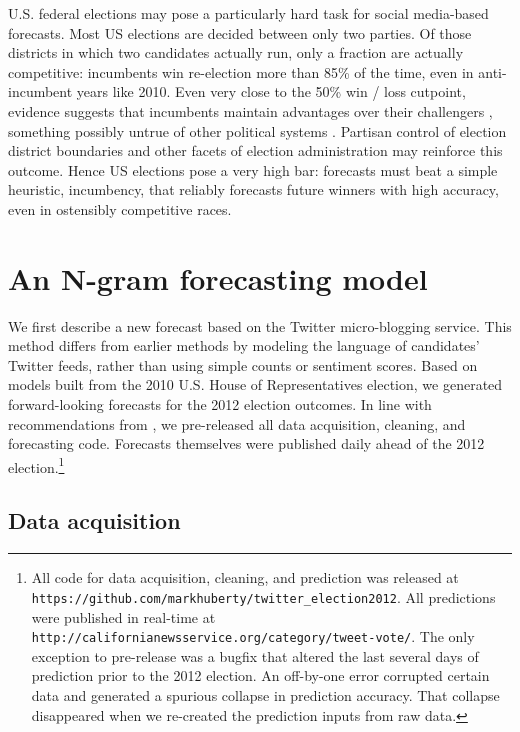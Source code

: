 \documentclass{sig-alternate-2013}
\begin{document}
U.S. federal elections may pose a particularly hard task for social
media-based forecasts. Most US elections are decided between only two
parties. Of those districts in which two candidates actually run, only
a fraction are actually competitive: incumbents win re-election more
than 85\% of the time, even in anti-incumbent years like 2010. Even
very close to the 50\% win / loss cutpoint, evidence suggests that
incumbents maintain advantages over their challengers
\cite{caughey2011elections}, something possibly untrue of other
political systems \cite{eggers2013validity}. Partisan control of
election district boundaries and other facets of election
administration may reinforce this outcome. Hence US elections pose a
very high bar: forecasts must beat a simple heuristic, incumbency,
that reliably forecasts future winners with high accuracy, even in
ostensibly competitive races.

\section{An N-gram forecasting model}
\label{sec:multi-cycle-forecast}

We first describe a new forecast based on the Twitter micro-blogging
service. This method differs from earlier methods by 
modeling the language of candidates' Twitter feeds, rather than using
simple counts or sentiment scores. Based on models built from the 2010
U.S. House of Representatives election, we generated forward-looking
forecasts for the 2012 election outcomes. In line with recommendations
from \cite{metaxas2011not}, we pre-released all data acquisition,
cleaning, and forecasting code. Forecasts themselves were published
daily ahead of the 2012 election.\footnote{All code for data acquisition,
  cleaning, and prediction was released at
  \texttt{https://github.com/markhuberty/twitter\_election2012}. All
  predictions were published in real-time at
  \texttt{http://californianewsservice.org/category/tweet-vote/}. The
  only exception to pre-release was a bugfix that altered the last
  several days of prediction prior to the 2012 election. An off-by-one
  error corrupted certain data and generated a spurious collapse in
  prediction accuracy. That collapse disappeared when we re-created
  the prediction inputs from raw data.} 


\subsection{Data acquisition}
\label{sec:data-acquisition}
\end{document}
